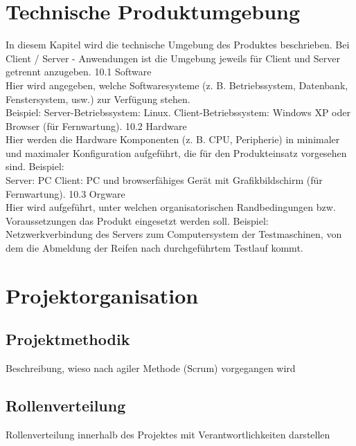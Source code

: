 \documentclass[%
	12pt,
	a4paper,
	oneside,
	parskip=full
]{scrbook}
\begin{document}
\chapter{Technische Produktumgebung}
In diesem Kapitel wird die technische Umgebung des Produktes beschrieben. Bei Client /
Server - Anwendungen ist die Umgebung jeweils für Client und Server getrennt anzugeben.
10.1 Software\\
Hier wird angegeben, welche Softwaresysteme (z. B. Betriebssystem, Datenbank,
Fenstersystem, usw.) zur Verfügung stehen.\\
Beispiel:
Server-Betriebssystem: Linux.
Client-Betriebssystem: Windows XP oder Browser (für Fernwartung).
10.2 Hardware \\
Hier werden die Hardware Komponenten (z. B. CPU, Peripherie) in minimaler und maximaler
Konfiguration aufgeführt, die für den Produkteinsatz vorgesehen sind.
Beispiel:\\
Server: PC
Client: PC und browserfähiges Gerät mit Grafikbildschirm (für Fernwartung).
10.3 Orgware\\
Hier wird aufgeführt, unter welchen organisatorischen Randbedingungen bzw.
Voraussetzungen das Produkt eingesetzt werden soll.
Beispiel:\\
Netzwerkverbindung des Servers zum Computersystem der Testmaschinen, von dem die
Abmeldung der Reifen nach durchgeführtem Testlauf kommt.

\chapter{Projektorganisation}
\section{Projektmethodik}
Beschreibung, wieso nach agiler Methode (Scrum) vorgegangen wird
\section{Rollenverteilung}
Rollenverteilung innerhalb des Projektes mit Verantwortlichkeiten darstellen
\end{document}
